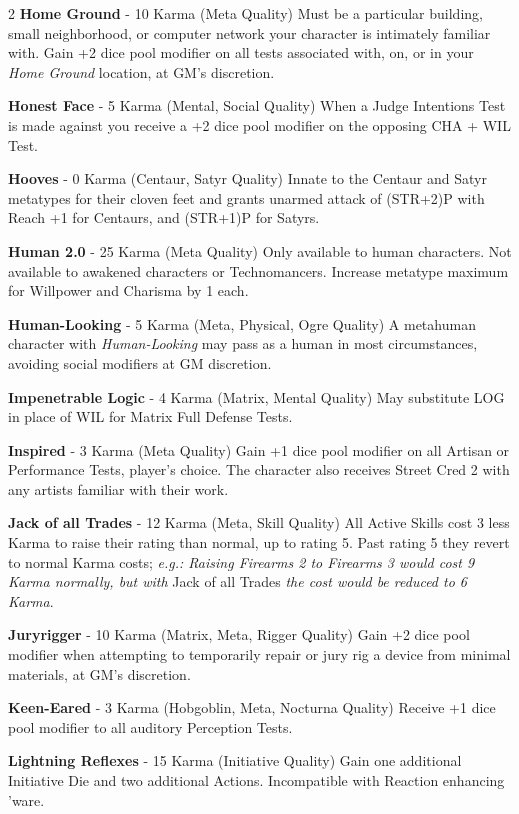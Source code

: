 \documentclass[
  oneside]{article}
\begin{document}
\begin{multicols}{2}
\textbf{Home Ground} - 10 Karma (Meta Quality)
Must be a particular building, small neighborhood,
or computer network your character is intimately
familiar with. Gain +2 dice pool modifier on all
tests associated with, on, or in your \emph{Home
Ground} location, at GM's discretion.

\textbf{Honest Face} - 5 Karma (Mental, Social
Quality) When a Judge Intentions Test is made
against you receive a +2 dice pool modifier on the
opposing CHA + WIL Test.

\textbf{Hooves} - 0 Karma (Centaur, Satyr Quality)
Innate to the Centaur and Satyr metatypes for
their cloven feet and grants unarmed attack of
(STR+2)P with Reach +1 for Centaurs, and (STR+1)P
for Satyrs.

\textbf{Human 2.0} - 25 Karma (Meta Quality) Only
available to human characters. Not available to
awakened characters or Technomancers. Increase
metatype maximum for Willpower and Charisma by 1
each.

\textbf{Human-Looking} - 5 Karma (Meta, Physical,
Ogre Quality) A metahuman character with
\emph{Human-Looking} may pass as a human in most
circumstances, avoiding social modifiers at GM
discretion.

\textbf{Impenetrable Logic} - 4 Karma (Matrix,
Mental Quality) May substitute LOG in place of WIL
for Matrix Full Defense Tests.

\textbf{Inspired} - 3 Karma (Meta Quality) Gain +1
dice pool modifier on all Artisan or Performance
Tests, player's choice. The character also
receives Street Cred 2 with any artists familiar
with their work.

\textbf{Jack of all Trades} - 12 Karma (Meta,
Skill Quality) All Active Skills cost 3 less Karma
to raise their rating than normal, up to rating 5.
Past rating 5 they revert to normal Karma costs;
\emph{e.g.: Raising Firearms 2 to Firearms 3 would
cost 9 Karma normally, but with} Jack of all
Trades \emph{the cost would be reduced to 6
Karma}.

\textbf{Juryrigger} - 10 Karma (Matrix, Meta,
Rigger Quality) Gain +2 dice pool modifier when
attempting to temporarily repair or jury rig a
device from minimal materials, at GM's discretion.

\textbf{Keen-Eared} - 3 Karma (Hobgoblin, Meta,
Nocturna Quality) Receive +1 dice pool modifier to
all auditory Perception Tests.

\textbf{Lightning Reflexes} - 15 Karma (Initiative
Quality) Gain one additional Initiative Die and
two additional Actions. Incompatible with Reaction
enhancing 'ware.


\end{multicols}
\end{document}
